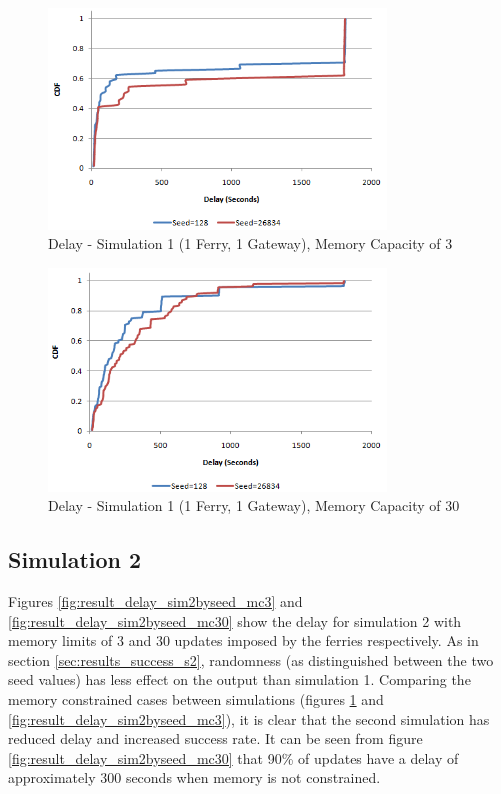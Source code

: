 \begin{figure}[htbp]
    \centering
    \includegraphics[width=0.8\textwidth]{images/result_delay_sim1byseed_mc3.png}
    \caption{Delay - Simulation 1 (1 Ferry, 1 Gateway), Memory Capacity of 3}
    \label{fig:result_delay_sim1byseed_mc3}
\end{figure}

\begin{figure}[htbp]
    \centering
    \includegraphics[width=0.8\textwidth]{images/result_delay_sim1byseed_mc30.png}
    \caption{Delay - Simulation 1 (1 Ferry, 1 Gateway), Memory Capacity of 30}
    \label{fig:result_delay_sim1byseed_mc30}
\end{figure}

\subsection{Simulation 2}

Figures \ref{fig:result_delay_sim2byseed_mc3} and \ref{fig:result_delay_sim2byseed_mc30} show the delay for simulation 2 with memory limits of 3 and 30 updates imposed by the ferries respectively.
As in section \ref{sec:results_success_s2}, randomness (as distinguished between the two seed values) has less effect on the output than simulation 1.
Comparing the memory constrained cases between simulations (figures \ref{fig:result_delay_sim1byseed_mc3} and \ref{fig:result_delay_sim2byseed_mc3}), it is clear that the second simulation has reduced delay and increased success rate.
It can be seen from figure \ref{fig:result_delay_sim2byseed_mc30} that 90\% of updates have a delay of approximately 300 seconds when memory is not constrained.


